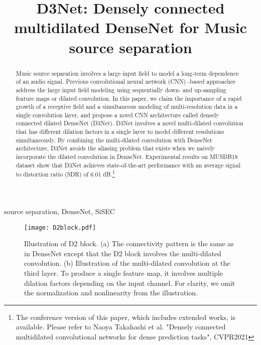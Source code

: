 \documentclass{article}
\title{D3Net: Densely connected multidilated DenseNet for Music source separation}
\begin{document}
\ninept
\fontsize{9.5pt}{12.6pt}\selectfont


\maketitle
\begin{abstract}
Music source separation involves a large input field to model a long-term dependence of an audio signal. Previous convolutional neural network (CNN) -based approaches address the large input field modeling using sequentially down- and up-sampling feature maps or dilated convolution. In this paper, we claim the importance of a rapid growth of a receptive field and a simultaneous modeling of multi-resolution data in a single convolution layer, and propose a novel CNN architecture called densely connected dilated DenseNet (D3Net). D3Net involves a novel multi-dilated convolution that has different dilation factors in a single layer to model different resolutions simultaneously. By combining the multi-dilated convolution with DenseNet architecture, D3Net avoids the aliasing problem that exists when we naively incorporate the dilated convolution in DenseNet. 
Experimental results on MUSDB18 dataset show that D3Net achieves state-of-the-art performance with an average signal to distortion ratio (SDR) of 6.01 dB.\footnote{The conference version of this paper, which includes extended works, is available. Please refer to Naoya Takahashi et al. "Densely connected multidilated convolutional networks for dense prediction tasks", CVPR2021}
\end{abstract}
\begin{keywords}
source separation, DenseNet, SiSEC
\end{keywords}


\begin{figure*}[t]
  \centering
  \texttt{[image: D2block.pdf]}
  \caption{Illustration of D2 block. (a) The connectivity pattern is the same as in DenseNet except that the D2 block involves the multi-dilated convolution. (b) Illustration of the multi-dilated convolution at the third layer. To produce a single feature map, it involves multiple dilation factors depending on the input channel. For clarity, we omit the normalization and nonlinearity from the illustration.
}
  \label{fig:d2block}
\end{figure*}
\end{document}
